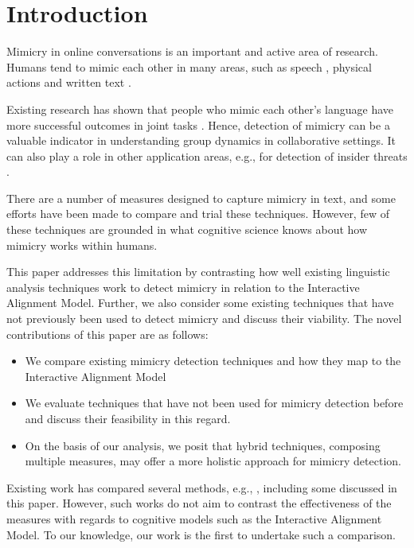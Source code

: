 \documentclass[conference]{IEEEtran}
\begin{document}
\IEEEpeerreviewmaketitle


\section{Introduction}

Mimicry in online conversations is an important and active area of research. Humans tend to mimic each other in many areas, such as speech \cite{levelt1982surface, bock1986syntactic, bock1989closed, garrod1987saying}, physical actions \cite{bernieri1988coordinated} and written text \cite{danescu2011chameleons, scissors2008linguistic}.

Existing research has shown that people who mimic each other’s language have more successful outcomes in joint tasks \cite{maddux2008chameleons}. Hence, detection of mimicry can be a valuable indicator in understanding group dynamics in collaborative settings. It can also play a role in other application areas, e.g., for detection of insider threats \cite{taylor2013detecting}.

There are a number of measures designed to capture mimicry in text, and some efforts have been made to compare and trial these techniques. However, few of these techniques are grounded in what cognitive  science knows about how mimicry works within humans.

This paper addresses this limitation by contrasting how well existing linguistic analysis techniques work to detect mimicry in relation to the Interactive Alignment Model. Further, we also consider some existing techniques that have not previously been used to detect mimicry and discuss their viability. The novel contributions of this paper are as follows:
\begin{itemize}
	\item We compare existing mimicry detection techniques and how they map to the Interactive Alignment Model 
	\item  We evaluate techniques that have not been used for mimicry detection before and discuss their feasibility in this regard.
	\item On the basis of our analysis, we posit that hybrid techniques, composing multiple measures, may offer a more holistic approach for mimicry detection.
\end{itemize}

Existing work has compared several methods, e.g., \cite{xu2015evaluation}, including some discussed in this paper. However, such works do not aim to contrast the effectiveness of the measures with regards to cognitive models such as the Interactive Alignment Model. To our knowledge, our work is the first to undertake such a comparison.
\end{document}
